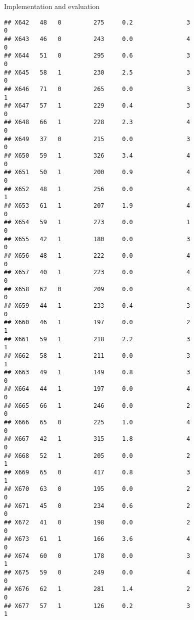 \documentclass[
  ignorenonframetext,
]{beamer}
\begin{document}
\begin{frame}[fragile]{Implementation and evaluation}
\begin{verbatim}
## X642   48   0         275     0.2               3                   0
## X643   46   0         243     0.0               4                   0
## X644   51   0         295     0.6               3                   0
## X645   58   1         230     2.5               3                   0
## X646   71   0         265     0.0               3                   1
## X647   57   1         229     0.4               3                   0
## X648   66   1         228     2.3               4                   0
## X649   37   0         215     0.0               3                   0
## X650   59   1         326     3.4               4                   0
## X651   50   1         200     0.9               4                   0
## X652   48   1         256     0.0               4                   1
## X653   61   1         207     1.9               4                   0
## X654   59   1         273     0.0               1                   0
## X655   42   1         180     0.0               3                   0
## X656   48   1         222     0.0               4                   0
## X657   40   1         223     0.0               4                   0
## X658   62   0         209     0.0               4                   0
## X659   44   1         233     0.4               3                   0
## X660   46   1         197     0.0               2                   1
## X661   59   1         218     2.2               3                   1
## X662   58   1         211     0.0               3                   1
## X663   49   1         149     0.8               3                   0
## X664   44   1         197     0.0               4                   0
## X665   66   1         246     0.0               2                   0
## X666   65   0         225     1.0               4                   0
## X667   42   1         315     1.8               4                   0
## X668   52   1         205     0.0               2                   1
## X669   65   0         417     0.8               3                   1
## X670   63   0         195     0.0               2                   0
## X671   45   0         234     0.6               2                   0
## X672   41   0         198     0.0               2                   0
## X673   61   1         166     3.6               4                   0
## X674   60   0         178     0.0               3                   1
## X675   59   0         249     0.0               4                   0
## X676   62   1         281     1.4               2                   0
## X677   57   1         126     0.2               3                   1

\end{verbatim}
\end{frame}
\end{document}
